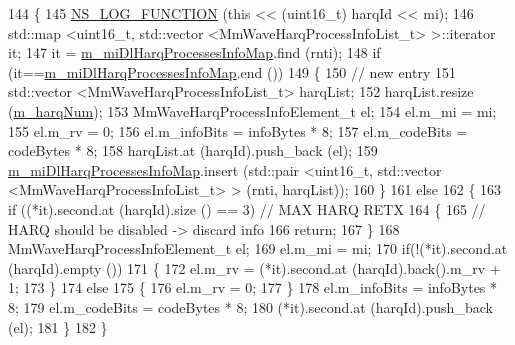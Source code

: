 \begin{DoxyCode}
144 \{
145   \hyperlink{log-macros-disabled_8h_a90b90d5bad1f39cb1b64923ea94c0761}{NS\_LOG\_FUNCTION} (\textcolor{keyword}{this} << (uint16\_t) harqId << mi);
146   std::map <uint16\_t, std::vector <MmWaveHarqProcessInfoList\_t> >::iterator it;
147     it = \hyperlink{classns3_1_1MmWaveHarqPhy_aed3643640d3493d9afd67293bb33a2d2}{m\_miDlHarqProcessesInfoMap}.find (rnti);
148     \textcolor{keywordflow}{if} (it==\hyperlink{classns3_1_1MmWaveHarqPhy_aed3643640d3493d9afd67293bb33a2d2}{m\_miDlHarqProcessesInfoMap}.end ())
149       \{
150         \textcolor{comment}{// new entry}
151         std::vector <MmWaveHarqProcessInfoList\_t> harqList;
152         harqList.resize (\hyperlink{classns3_1_1MmWaveHarqPhy_a3f052a77084afbac3ae04ca1de543a71}{m\_harqNum});
153         MmWaveHarqProcessInfoElement\_t el;
154         el.m\_mi = mi;
155         el.m\_rv = 0;
156         el.m\_infoBits = infoBytes * 8;
157         el.m\_codeBits = codeBytes * 8;
158         harqList.at (harqId).push\_back (el);
159         \hyperlink{classns3_1_1MmWaveHarqPhy_aed3643640d3493d9afd67293bb33a2d2}{m\_miDlHarqProcessesInfoMap}.insert (std::pair <uint16\_t, std::vector
       <MmWaveHarqProcessInfoList\_t> > (rnti, harqList));
160       \}
161     \textcolor{keywordflow}{else}
162       \{
163         \textcolor{keywordflow}{if} ((*it).second.at (harqId).size () == 3) \textcolor{comment}{// MAX HARQ RETX}
164           \{
165             \textcolor{comment}{// HARQ should be disabled -> discard info}
166             \textcolor{keywordflow}{return};
167           \}
168         MmWaveHarqProcessInfoElement\_t el;
169         el.m\_mi = mi;
170         \textcolor{keywordflow}{if}(!(*it).second.at (harqId).empty ())
171         \{
172                 el.m\_rv = (*it).second.at (harqId).back().m\_rv + 1;
173         \}
174         \textcolor{keywordflow}{else}
175         \{
176                 el.m\_rv = 0;
177         \}
178         el.m\_infoBits = infoBytes * 8;
179         el.m\_codeBits = codeBytes * 8;
180         (*it).second.at (harqId).push\_back (el);
181       \}
182 \}
\end{DoxyCode}
